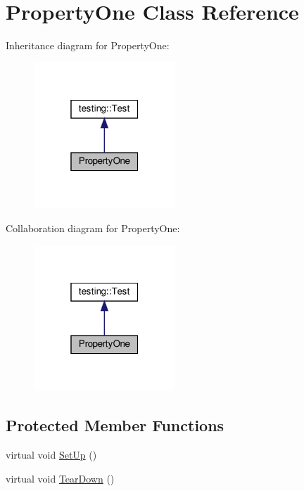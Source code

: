 \hypertarget{class_property_one}{}\section{Property\+One Class Reference}
\label{class_property_one}


Inheritance diagram for Property\+One\+:
\nopagebreak
\begin{figure}[H]
\begin{center}
\leavevmode
\includegraphics[width=151pt]{class_property_one__inherit__graph}
\end{center}
\end{figure}


Collaboration diagram for Property\+One\+:
\nopagebreak
\begin{figure}[H]
\begin{center}
\leavevmode
\includegraphics[width=151pt]{class_property_one__coll__graph}
\end{center}
\end{figure}
\subsection*{Protected Member Functions}
\begin{DoxyCompactItemize}
\item 
virtual void \hyperlink{class_property_one_a9cb7d7cb508d5f1a6fc7cfead81ebc2b}{Set\+Up} ()
\item 
virtual void \hyperlink{class_property_one_a3ed895113848403d5ea27f52a1bb0545}{Tear\+Down} ()
\end{DoxyCompactItemize}
